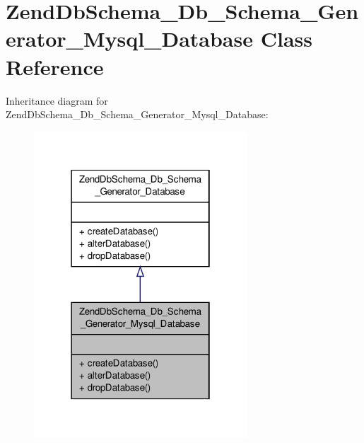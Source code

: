 \hypertarget{classZendDbSchema__Db__Schema__Generator__Mysql__Database}{\section{Zend\-Db\-Schema\-\_\-\-Db\-\_\-\-Schema\-\_\-\-Generator\-\_\-\-Mysql\-\_\-\-Database Class Reference}
\label{classZendDbSchema__Db__Schema__Generator__Mysql__Database}
}


Inheritance diagram for Zend\-Db\-Schema\-\_\-\-Db\-\_\-\-Schema\-\_\-\-Generator\-\_\-\-Mysql\-\_\-\-Database\-:\nopagebreak
\begin{figure}[H]
\begin{center}
\leavevmode
\includegraphics[width=226pt]{classZendDbSchema__Db__Schema__Generator__Mysql__Database__inherit__graph}
\end{center}
\end{figure}


